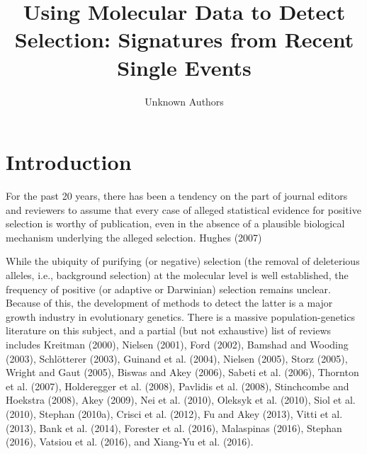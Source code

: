 \documentclass{article}
\title{Using Molecular Data to Detect Selection: Signatures from Recent Single Events}
\author{Unknown Authors}
\date{}
\begin{document}
\maketitle

\begin{abstract}

\end{abstract}

\section{Introduction}
For the past 20 years, there has been a tendency on the part of journal editors and reviewers to assume that every case of alleged statistical evidence for positive selection is worthy of publication, even in the absence of a plausible biological mechanism underlying the alleged selection. Hughes (2007)

While the ubiquity of purifying (or negative) selection (the removal of deleterious alleles, i.e., background selection) at the molecular level is well established, the frequency of positive (or adaptive or Darwinian) selection remains unclear. Because of this, the development of methods to detect the latter is a major growth industry in evolutionary genetics. There is a massive population-genetics literature on this subject, and a partial (but not exhaustive) list of reviews includes Kreitman (2000), Nielsen (2001), Ford (2002), Bamshad and Wooding (2003), Schlötterer (2003), Guinand et al. (2004), Nielsen (2005), Storz (2005), Wright and Gaut (2005), Biswas and Akey (2006), Sabeti et al. (2006), Thornton et al. (2007), Holderegger et al. (2008), Pavlidis et al. (2008), Stinchcombe and Hoekstra (2008), Akey (2009), Nei et al. (2010), Oleksyk et al. (2010), Siol et al. (2010), Stephan (2010a), Crisci et al. (2012), Fu and Akey (2013), Vitti et al. (2013), Bank et al. (2014), Forester et al. (2016), Malaspinas (2016), Stephan (2016), Vatsiou et al. (2016), and Xiang-Yu et al. (2016).
\end{document}
